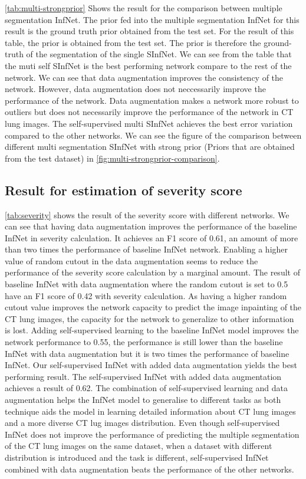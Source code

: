  \ref{tab:multi-strongprior} Shows the result for the comparison between multiple segmentation InfNet. The prior fed into the multiple segmentation InfNet for this result is the ground truth prior obtained from the test set. For the result of this table, the prior is obtained from the test set. The prior is therefore the ground-truth of the segmentation of the single SInfNet. 
 We can see from the table that the muti self SInfNet is the best performing network compare to the rest of the network. We can see that data augmentation improves the consistency of the network. However, data augmentation does not neccessarily improve the performance of the network. Data augmentation makes a network more robust to outliers but does not necessarily improve the performance of the network in CT lung images. The self-supervised multi SInfNet achieves the best error variation compared to the other networks. We can see the figure of the comparison between different multi segmentation SInfNet with strong prior (Priors that are obtained from the test dataset) in \ref{fig:multi-strongprior-comparison}.


\subsection{Result for estimation of severity score}
\ref{tab:severity} shows the result of the severity score with different networks. We can see that having data augmentation improves the performance of the baseline InfNet in severity calculation. It achieves an F1 score of 0.61,  an amount of more than two times the performance of baseline InfNet network. Enabling a higher value of random cutout in the data augmentation seems to reduce the performance of the severity score calculation by a marginal amount. The result of baseline InfNet with data augmentation where the random cutout is set to 0.5 have an F1 score of 0.42 with severity calculation. As having a higher random cutout value improves the network capacity to predict the image inpainting of the CT lung images, the capacity for the network to generalize to other information is lost. Adding self-supervised learning to the baseline InfNet model improves the network performance to 0.55, the performance is still lower than the baseline InfNet with data augmentation but it is two times the performance of baseline InfNet. Our self-supervised InfNet with added data augmentation yields the best performing result. The self-supervised InfNet with added data augmentation achieves a result of 0.62. The combination of self-supervised learning and data augmentation helps the InfNet model to generalise to different tasks as both technique aids the model in learning detailed information about CT lung images and a more diverse CT lug images distribution. Even though self-supervised InfNet does not improve the performance of predicting the multiple segmentation of the CT lung images on the same dataset, when a dataset with different distribution is introduced and the task is different, self-supervised InfNet combined with data augmentation beats the performance of the other networks.